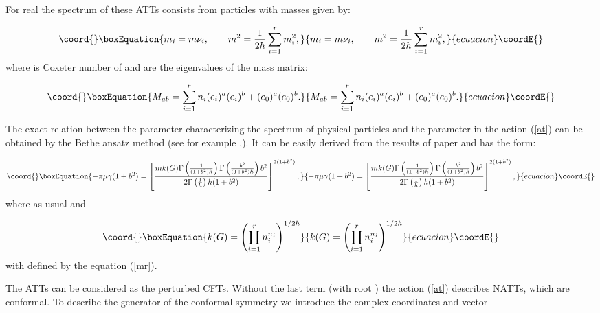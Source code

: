 \documentclass[a4paper,12pt]{article}
\begin{document}
For real \coordHE{} the spectrum of these ATTs consists from \coordHE{} particles with
masses \coordHE{} given by:

\begin{equation}\coord{}\boxEquation{
m_i=m\nu _i,\qquad m^2=\frac 1{2h}\sum_{i=1}^rm_i^2,  \label{s}
}{
m_i=m\nu _i,\qquad m^2=\frac 1{2h}\sum_{i=1}^rm_i^2,  }{ecuacion}\coordE{}\end{equation}
where \coordHE{} is Coxeter number of \coordHE{} and \coordHE{} are the eigenvalues of the
mass matrix:

\begin{equation}\coord{}\boxEquation{
M_{ab}=\sum_{i=1}^rn_i(e_i)^a(e_i)^b+(e_0)^a(e_0)^b.  \label{mab}
}{
M_{ab}=\sum_{i=1}^rn_i(e_i)^a(e_i)^b+(e_0)^a(e_0)^b.  }{ecuacion}\coordE{}\end{equation}

The exact relation between the parameter \coordHE{} characterizing the spectrum of
physical particles and the parameter \myHighlight{$\mu $}\coordHE{} in the action (\ref{at}) can be
obtained by the Bethe ansatz method (see for example \cite{ALZ},\cite{F}).
It can be easily derived from the results of paper \cite{F} and has the form:

\begin{equation}\coord{}\boxEquation{
-\pi \mu \gamma (1+b^2)=\left[ \frac{mk(G)\Gamma \left( \frac 1{(1+b^2)h}
\right) \Gamma \left(\frac{b^2}{(1+b^2)h}\right)b^2 }{2\Gamma \left( \frac 1h
\right)h(1+b^2) }\right] ^{2(1+b^2)},  \label{mmu}
}{
-\pi \mu \gamma (1+b^2)=\left[ \frac{mk(G)\Gamma \left( \frac 1{(1+b^2)h}
\right) \Gamma \left(\frac{b^2}{(1+b^2)h}\right)b^2 }{2\Gamma \left( \frac 1h
\right)h(1+b^2) }\right] ^{2(1+b^2)},  }{ecuacion}\coordE{}\end{equation}
where as usual \coordHE{} and

\begin{equation}\coord{}\boxEquation{
k(G)=\left( \prod_{i=1}^rn_i^{n_i}\right) ^{1/2h}  \label{k}
}{
k(G)=\left( \prod_{i=1}^rn_i^{n_i}\right) ^{1/2h}  }{ecuacion}\coordE{}\end{equation}
with \coordHE{} defined by the equation (\ref{mr}).

The ATTs can be considered as the perturbed CFTs. Without the last term
(with root \coordHE{}) the action (\ref{at}) describes NATTs, which are
conformal. To describe the generator of the conformal symmetry we introduce
the complex coordinates \coordHE{} and vector
\end{document}

